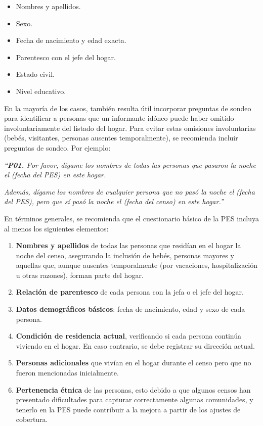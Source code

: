 \documentclass[
  12pt,
]{book}
\providecommand{\tightlist}{%
  \setlength{\itemsep}{0pt}\setlength{\parskip}{0pt}}
\begin{document}
\begin{itemize}
\tightlist
\item
  Nombres y apellidos.
\item
  Sexo.
\item
  Fecha de nacimiento y edad exacta.
\item
  Parentesco con el jefe del hogar.
\item
  Estado civil.
\item
  Nivel educativo.
\end{itemize}

En la mayoría de los casos, también resulta útil incorporar preguntas de sondeo para identificar a personas que un informante idóneo puede haber omitido involuntariamente del listado del hogar. Para evitar estas omisiones involuntarias (bebés, visitantes, personas ausentes temporalmente), se recomienda incluir preguntas de sondeo. Por ejemplo:

\emph{``\textbf{P01.} Por favor, dígame los nombres de todas las personas que pasaron la noche el (fecha del PES) en este hogar.}

\emph{Además, dígame los nombres de cualquier persona que no pasó la noche el (fecha del PES), pero que sí pasó la noche el (fecha del censo) en este hogar.''}

En términos generales, se recomienda que el cuestionario básico de la PES incluya al menos los siguientes elementos:

\begin{enumerate}
\def\labelenumi{\alph{enumi}.}
\tightlist
\item
  \textbf{Nombres y apellidos} de todas las personas que residían en el hogar la noche del censo, asegurando la inclusión de bebés, personas mayores y aquellas que, aunque ausentes temporalmente (por vacaciones, hospitalización u otras razones), forman parte del hogar.
\item
  \textbf{Relación de parentesco} de cada persona con la jefa o el jefe del hogar.
\item
  \textbf{Datos demográficos básicos}: fecha de nacimiento, edad y sexo de cada persona.
\item
  \textbf{Condición de residencia actual}, verificando si cada persona continúa viviendo en el hogar. En caso contrario, se debe registrar su dirección actual.
\item
  \textbf{Personas adicionales} que vivían en el hogar durante el censo pero que no fueron mencionadas inicialmente.
\item
  \textbf{Pertenencia étnica} de las personas, esto debido a que algunos censos han presentado dificultades para capturar correctamente algunas comunidades, y tenerlo en la PES puede contribuir a la mejora a partir de los ajustes de cobertura.
\end{enumerate}
\end{document}
